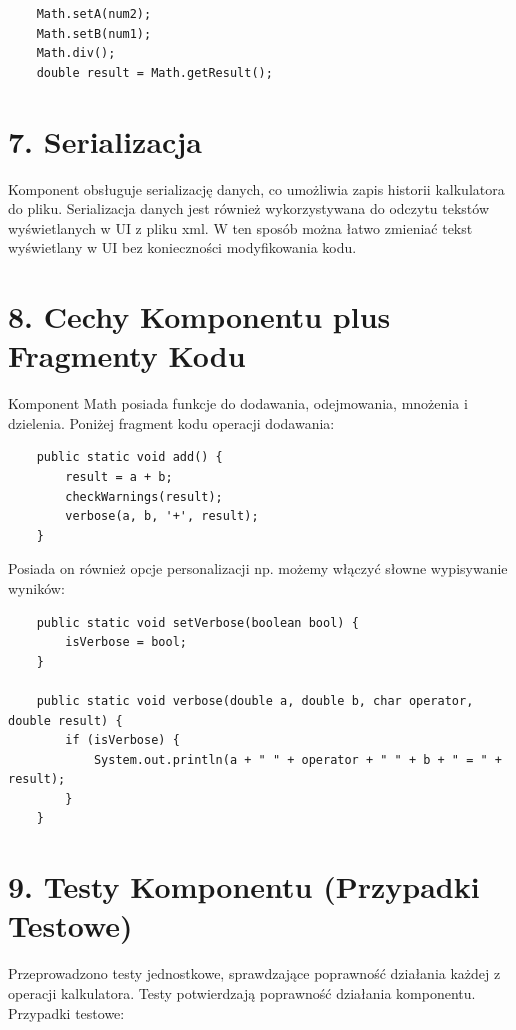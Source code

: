 \documentclass{article}
\begin{document}
\begin{verbatim}
    Math.setA(num2);
    Math.setB(num1);
    Math.div();
    double result = Math.getResult();
\end{verbatim}

\section*{7. Serializacja}

Komponent obsługuje serializację danych, co umożliwia zapis historii kalkulatora do pliku.
Serializacja danych jest również wykorzystywana do odczytu tekstów wyświetlanych w UI z pliku xml.
W ten sposób można łatwo zmieniać tekst wyświetlany w UI bez konieczności modyfikowania kodu.

\section*{8. Cechy Komponentu plus Fragmenty Kodu}

Komponent Math posiada funkcje do dodawania, odejmowania, mnożenia i dzielenia. Poniżej fragment kodu operacji dodawania:

\begin{verbatim}
    public static void add() {
        result = a + b;
        checkWarnings(result);
        verbose(a, b, '+', result);
    }
\end{verbatim}
Posiada on również opcje personalizacji np. możemy włączyć słowne wypisywanie wyników:

\begin{verbatim}
    public static void setVerbose(boolean bool) {
        isVerbose = bool;
    }

    public static void verbose(double a, double b, char operator, double result) {
        if (isVerbose) {
            System.out.println(a + " " + operator + " " + b + " = " + result);
        }
    }
\end{verbatim}

\section*{9. Testy Komponentu (Przypadki Testowe)}

Przeprowadzono testy jednostkowe, sprawdzające poprawność działania każdej z operacji kalkulatora.
Testy potwierdzają poprawność działania komponentu.
Przypadki testowe:
\end{document}

